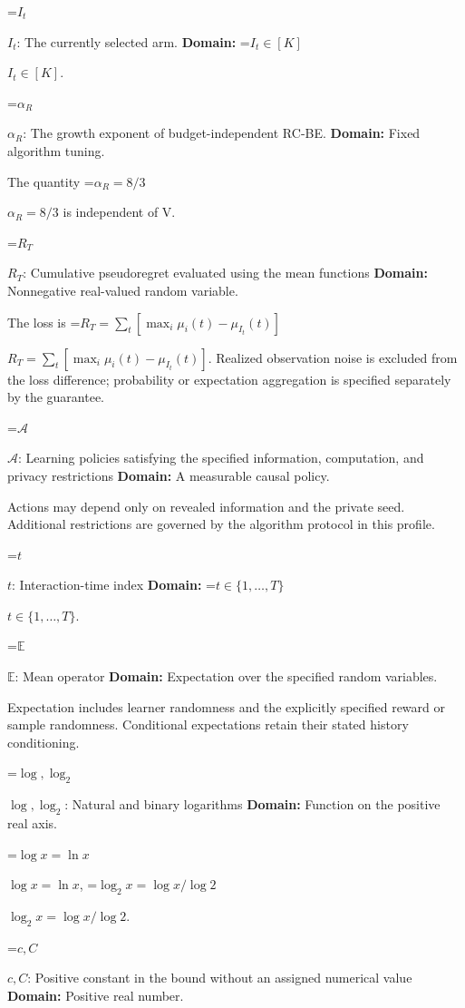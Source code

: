\documentclass[10pt,a4paper]{article}
\newcommand{\AtlasMath}[1]{\par\begingroup\centering\setbox0=\hbox{$\displaystyle #1$}\ifdim\wd0>1.4\linewidth\typeout{ATLAS WIDE FORMULA: \the\wd0}\fi\ifdim\wd0>\linewidth\resizebox{\linewidth}{!}{\box0}\else\box0\fi\par\endgroup}
\newcommand{\AtlasInlineMath}[1]{\begingroup\setbox0=\hbox{$#1$}\ifdim\wd0>.4\linewidth\endgroup\AtlasMath{#1}\else\endgroup$#1$\fi}
\begin{document}
\AtlasInlineMath{I_t}: The currently selected arm. \textbf{Domain:} \AtlasInlineMath{I_t\in[K]}.



\AtlasInlineMath{\alpha_R}: The growth exponent of budget-independent RC-BE. \textbf{Domain:} Fixed algorithm tuning.



The quantity \AtlasInlineMath{\alpha_R=8/3} is independent of V.



\AtlasInlineMath{R_T}: Cumulative pseudoregret evaluated using the mean functions \textbf{Domain:} Nonnegative real-valued random variable.



The loss is \AtlasInlineMath{R_T=\sum_t[\max_i\mu_i(t)-\mu_{I_t}(t)]}. Realized observation noise is excluded from the loss difference; probability or expectation aggregation is specified separately by the guarantee.



\AtlasInlineMath{\mathcal A}: Learning policies satisfying the specified information, computation, and privacy restrictions \textbf{Domain:} A measurable causal policy.



Actions may depend only on revealed information and the private seed. Additional restrictions are governed by the algorithm protocol in this profile.



\AtlasInlineMath{t}: Interaction-time index \textbf{Domain:} \AtlasInlineMath{t\in\{1,\ldots,T\}}.



\AtlasInlineMath{\mathbb E}: Mean operator \textbf{Domain:} Expectation over the specified random variables.



Expectation includes learner randomness and the explicitly specified reward or sample randomness. Conditional expectations retain their stated history conditioning.



\AtlasInlineMath{\log,\log_2}: Natural and binary logarithms \textbf{Domain:} Function on the positive real axis.



\AtlasInlineMath{\log x=\ln x}, \AtlasInlineMath{\log_2x=\log x/\log2}.



\AtlasInlineMath{c,C}: Positive constant in the bound without an assigned numerical value \textbf{Domain:} Positive real number.
\end{document}
